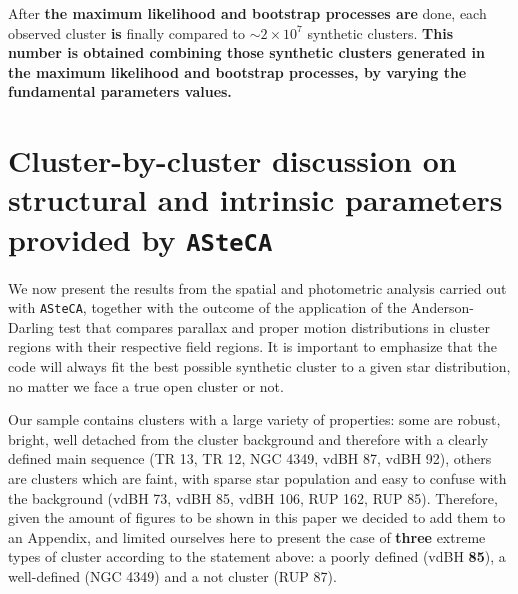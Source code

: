 \documentclass[referee]{aa}
\begin{document}
After \textbf{the maximum likelihood and bootstrap processes are} done,
each observed cluster \textbf{is} finally compared to $\sim2\times10^7$
synthetic clusters. \textbf{This number is obtained combining those synthetic
clusters generated in the maximum likelihood and bootstrap processes, by
varying the fundamental parameters values.}



\section{Cluster-by-cluster discussion on structural and intrinsic parameters
provided by \texttt{ASteCA}}
\label{sec:cluster_discuss}

We now present the results from the spatial and photometric analysis
carried out with \texttt{ASteCA}, together with the outcome of the application
of the Anderson-Darling test that compares parallax and proper motion
distributions in cluster regions with their respective field regions.
It is important to emphasize that the code will always fit the
best possible synthetic cluster to a given star distribution, no matter we
face a true open cluster or not.

Our sample contains clusters with a large variety of properties: some are
robust, bright, well detached from the cluster background and therefore with a
clearly defined main sequence (TR 13, TR 12, NGC 4349, vdBH 87, vdBH 92),
others are clusters which are faint, with sparse star population and easy to
confuse with the background (vdBH 73, vdBH 85, vdBH 106, RUP 162, RUP 85).
Therefore, given the amount of figures to be shown in this paper we decided to
add them to an Appendix, and limited ourselves here to present
the case of \textbf{three} extreme types of cluster according to the statement
above: a poorly defined (vdBH \textbf{85}), a well-defined (NGC 4349) and a not
cluster (RUP 87).
\end{document}
